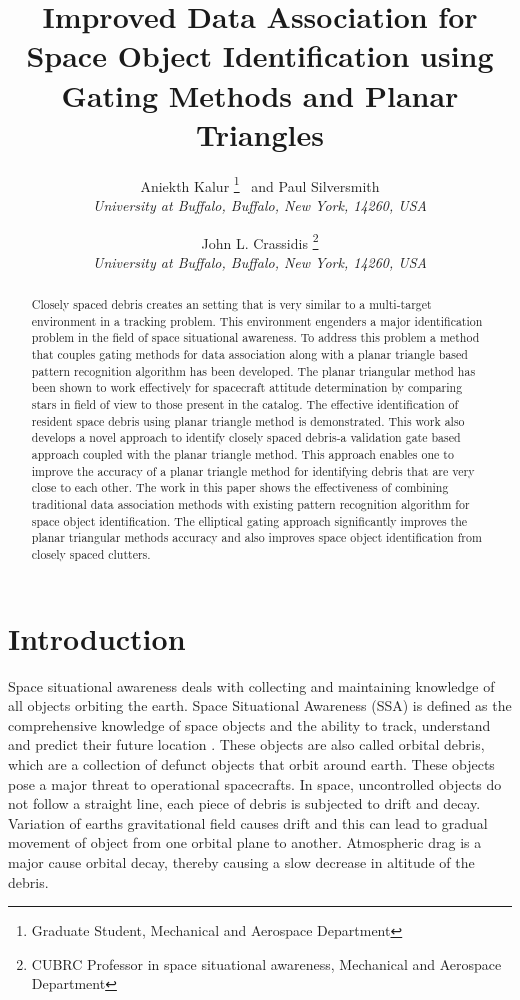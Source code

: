 \documentclass[]{aiaa-tc}%
\title{Improved Data Association for Space Object Identification using Gating Methods and Planar Triangles}
\author{
  Aniekth Kalur%
    \thanks{Graduate Student, Mechanical and Aerospace Department}
  \ and Paul Silversmith\thanksibid{1}\\
  {\normalsize\itshape
   University at Buffalo, Buffalo, New York, 14260, USA}\\
  \and
  John L. Crassidis%
   \thanks{CUBRC Professor in space situational awareness, Mechanical and Aerospace Department}\\
  {\normalsize\itshape
  University at Buffalo, Buffalo, New York, 14260, USA}
 }
\begin{document}
\maketitle

\begin{abstract}
Closely spaced debris creates an setting that is very similar to a multi-target environment in a tracking problem. This environment engenders a major identification problem in the field of space situational awareness. To address this problem a method that couples gating methods for data association along with a planar triangle based pattern recognition algorithm has been developed. The planar triangular method has been shown to work effectively for spacecraft attitude determination by comparing stars in field of view to those present in the catalog. The effective identification of resident space debris using planar triangle method is demonstrated. This work also develops a novel approach to identify closely spaced debris-a validation gate based approach  coupled with the planar triangle method. This approach enables one to improve the accuracy of a planar triangle method for identifying debris that are very close to each other. The work in this paper shows the effectiveness of combining traditional data association methods with existing pattern recognition algorithm for space object identification. The elliptical gating approach significantly improves the planar triangular methods accuracy and also improves space object identification from closely spaced clutters.
\end{abstract}


\section{Introduction}

Space situational awareness deals with collecting and maintaining knowledge of all objects orbiting the earth. Space Situational Awareness (SSA) is defined
as the comprehensive knowledge of space objects and the ability to track, understand and predict their future location \cite{becker_space_2015}. These objects are also called orbital debris, which are a collection of defunct objects that orbit around earth. These objects pose a major threat to operational spacecrafts. In space, uncontrolled objects do not follow a straight line, each piece of debris is subjected to drift and decay. Variation of earths gravitational field causes drift and this can lead to gradual movement of object from one orbital plane to another. Atmospheric drag is a major cause orbital decay, thereby causing a slow decrease in altitude of the debris. \\
\end{document}
